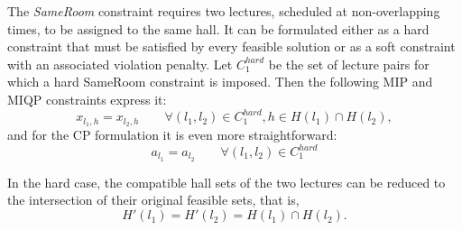 \documentclass[11pt]{article}
\begin{document}
The \emph{SameRoom} constraint requires two lectures, scheduled at non-overlapping times, to be assigned to the same hall. It can be formulated either as a hard constraint that must be satisfied by every feasible solution or as a soft constraint with an associated violation penalty.
Let $C_1^{hard}$ be the set of lecture pairs for which a hard SameRoom constraint is imposed. Then the following MIP and MIQP constraints express it:
\begin{equation}
	\label{eq:hard-SameRoom} x_{l_1,h} = x_{l_2,h}     \qquad \forall (l_1,l_2) \in C_1^{hard}, h \in H(l_1) \cap H(l_2),
\end{equation}
and for the CP formulation it is even more straightforward:
\begin{equation}
	\label{eq:hard-SameRoom-CP} a_{l_1} = a_{l_2}     \qquad \forall (l_1,l_2) \in C_1^{hard}
\end{equation}

In the hard case, the compatible hall sets of the two lectures can be reduced to the intersection of their original feasible sets, that is,
\[
H'(l_1)=H'(l_2)=H(l_1) \cap H(l_2).
\]
\end{document}
